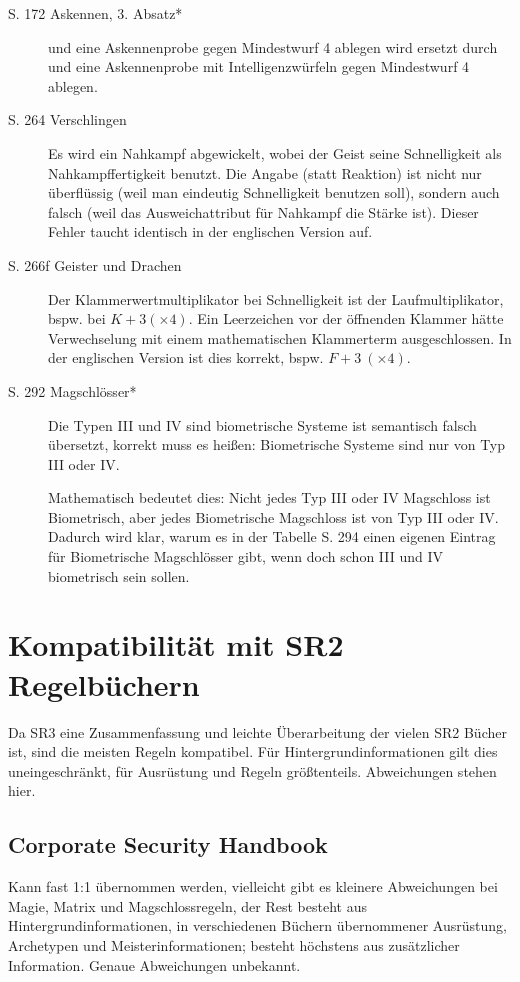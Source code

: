 \documentclass[a4paper]{scrartcl}
\newcommand{\ditoengl}{Dieser Fehler taucht identisch in der englischen Version auf. }
\begin{document}
\begin{description}
 \item[S. 172 Askennen, 3. Absatz*] \glqq und eine Askennenprobe gegen Mindestwurf 4 ablegen\grqq{} wird ersetzt durch \glqq und eine Askennenprobe mit Intelligenzwürfeln gegen Mindestwurf 4 ablegen\grqq.

 \item[S. 264 Verschlingen]
Es wird ein Nahkampf abgewickelt, wobei der Geist seine Schnelligkeit als Nahkampffertigkeit benutzt.
Die Angabe \glqq(statt Reaktion)\grqq{} ist nicht nur überflüssig (weil man eindeutig Schnelligkeit benutzen soll), sondern auch falsch (weil das Ausweichattribut für Nahkampf die Stärke ist). \ditoengl

 \item[S. 266f Geister und Drachen]
Der Klammerwertmultiplikator bei Schnelligkeit ist der Laufmultiplikator, bspw. bei $K+3(\times4)$. Ein Leerzeichen vor der öffnenden Klammer hätte Verwechselung mit einem mathematischen Klammerterm ausgeschlossen. In der englischen Version ist dies korrekt, bspw. $F+3\ (\times4)$.

 \item[S. 292 Magschlösser*]
\glqq Die Typen III und IV sind biometrische Systeme\grqq{} ist semantisch falsch übersetzt, korrekt muss es heißen: \glqq Biometrische Systeme sind nur von Typ III oder IV\grqq.

Mathematisch bedeutet dies: Nicht jedes Typ III oder IV Magschloss ist Biometrisch, aber jedes Biometrische Magschloss ist von Typ III oder IV.
Dadurch wird klar, warum es in der Tabelle S. 294 einen eigenen Eintrag für Biometrische Magschlösser gibt, wenn doch schon III und IV biometrisch sein sollen.
\end{description}

\section{Kompatibilität mit SR2 Regelbüchern}
Da SR3 eine Zusammenfassung und leichte Überarbeitung der vielen SR2 Bücher ist, sind die meisten Regeln kompatibel. Für Hintergrundinformationen gilt dies uneingeschränkt, für Ausrüstung und Regeln größtenteils.
Abweichungen stehen hier.

\subsection{Corporate Security Handbook}
Kann fast 1:1 übernommen werden, vielleicht gibt es kleinere Abweichungen bei Magie, Matrix und Magschlossregeln, der Rest besteht aus Hintergrundinformationen, in verschiedenen Büchern übernommener Ausrüstung, Archetypen und Meisterinformationen; besteht höchstens aus zusätzlicher Information. Genaue Abweichungen unbekannt.
\end{document}
